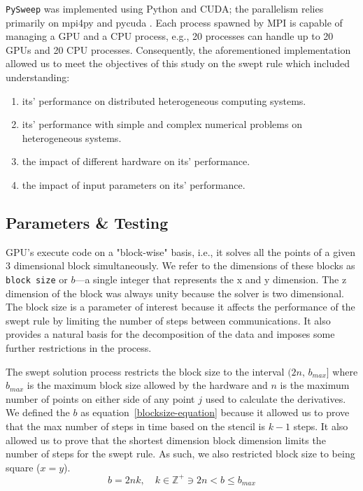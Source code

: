 \documentclass[review]{elsarticle}
\def\pysweep{\texttt{PySweep}}
\begin{document}
\par
\pysweep{} was implemented using Python and CUDA; the parallelism relies primarily on mpi4py and pycuda \cite{DalcinMPIPython, KlocknerPyCUDAGeneration}. Each process spawned by MPI is capable of managing a GPU and a CPU process, e.g., 20 processes can handle up to 20 GPUs and 20 CPU processes. Consequently, the aforementioned implementation allowed us to meet the objectives of this study on the swept rule which included understanding:
\begin{enumerate}
    \item its' performance on distributed heterogeneous computing systems.
    \item its' performance with simple and complex numerical problems on heterogeneous systems.
    \item the impact of different hardware on its' performance.
    \item the impact of input parameters on its' performance.
\end{enumerate}

\subsection{Parameters \& Testing}
\label{parameters-section}

GPU's execute code on a "block-wise" basis, i.e., it solves all the points of a given 3 dimensional block simultaneously. We refer to the dimensions of these blocks as \texttt{block size} or $b$---a single integer that represents the x and y dimension. The z dimension of the block was always unity because the solver is two dimensional. The block size is a parameter of interest because it affects the performance of the swept rule by limiting the number of steps between communications. It also provides a natural basis for the decomposition of the data and imposes some further restrictions in the process.

\par 
The swept solution process restricts the block size to the interval $(2n,\,b_{max}]$ where $b_{max}$ is the maximum block size allowed by the hardware and $n$ is the maximum number of points on either side of any point $j$ used to calculate the derivatives. We defined the $b$ as equation~\ref{blocksize-equation} because it allowed us to prove that the max number of steps in time based on the stencil is $k-1$ steps. It also allowed us to prove that the shortest dimension block dimension limits the number of steps for the swept rule. As such, we also restricted block size to being square ($x=y$).
\begin{equation}
    \label{blocksize-equation}
    b  = 2nk,\quad k\in\mathbb{Z}^{+}\ni 2n < b \leq b_{max}
\end{equation}
\end{document}
